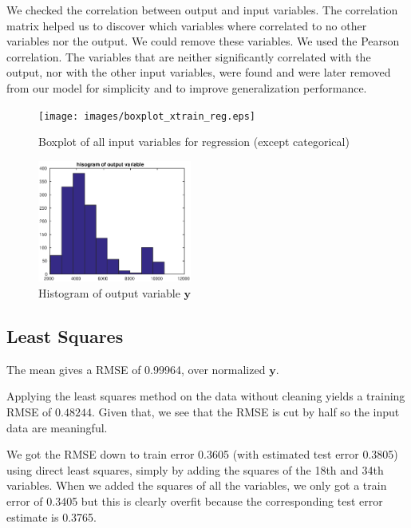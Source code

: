 \documentclass{article} %
\begin{document}
We checked the correlation between output and input variables. The correlation matrix helped us to discover which variables where correlated to no other variables nor the output. We could remove these variables. We used the Pearson correlation. The variables that are neither significantly correlated with the output, nor with the other input variables, were found and were later removed from our model for simplicity and to improve generalization performance.
\begin{figure}
\centering
\texttt{[image: images/boxplot\_xtrain\_reg.eps]}
\caption{Boxplot of all input variables for regression (except categorical)}
\label{fig:boxplot}
\end{figure}

\begin{figure}
\centering
\includegraphics[width=0.45\textwidth]{images/hist_output.eps}
\caption{Histogram of output variable $\mathbf{y}$}
\label{fig:outputhist}
\end{figure}

\subsection{Least Squares}

The mean gives a RMSE of 0.99964, over normalized $\mathbf{y}$.

Applying the least squares method on the data without cleaning yields a training RMSE of $0.48244$. Given that, we see that the RMSE is cut by half so the input data are meaningful.


We got the RMSE down to train error 0.3605 (with estimated test error 0.3805) using direct least squares, simply by adding the squares of the 18th and 34th variables. When we added the squares of all the variables, we only got a train error of 0.3405 but this is clearly overfit because the corresponding test error estimate is 0.3765.
\end{document}
